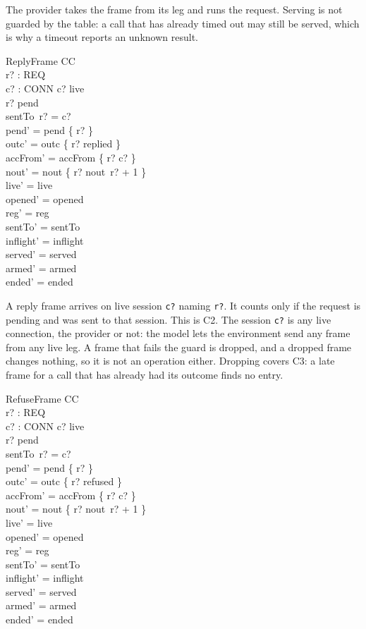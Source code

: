 \documentclass[a4paper,10pt,fleqn]{article}
\begin{document}
The provider takes the frame from its leg and runs the request.  Serving is
not guarded by the table: a call that has already timed out may still be
served, which is why a timeout reports an unknown result.

\begin{schema}{ReplyFrame}
  \Delta CC \\
  r? : REQ \\
  c? : CONN
\where
  c? \in live \\
  r? \in pend \\
  sentTo~r? = c? \\
  pend' = pend \setminus \{ r? \} \\
  outc' = outc \oplus \{ r? \mapsto replied \} \\
  accFrom' = accFrom \oplus \{ r? \mapsto c? \} \\
  nout' = nout \oplus \{ r? \mapsto nout~r? + 1 \} \\
  live' = live \\
  opened' = opened \\
  reg' = reg \\
  sentTo' = sentTo \\
  inflight' = inflight \\
  served' = served \\
  armed' = armed \\
  ended' = ended
\end{schema}

A reply frame arrives on live session \texttt{c?} naming \texttt{r?}.  It
counts only if the request is pending and was sent to that session.  This
is C2.  The session \texttt{c?} is any live connection, the provider or not:
the model lets the environment send any frame from any live leg.  A frame
that fails the guard is dropped, and a dropped frame changes nothing, so it
is not an operation either.  Dropping covers C3: a late frame for a call
that has already had its outcome finds no entry.

\begin{schema}{RefuseFrame}
  \Delta CC \\
  r? : REQ \\
  c? : CONN
\where
  c? \in live \\
  r? \in pend \\
  sentTo~r? = c? \\
  pend' = pend \setminus \{ r? \} \\
  outc' = outc \oplus \{ r? \mapsto refused \} \\
  accFrom' = accFrom \oplus \{ r? \mapsto c? \} \\
  nout' = nout \oplus \{ r? \mapsto nout~r? + 1 \} \\
  live' = live \\
  opened' = opened \\
  reg' = reg \\
  sentTo' = sentTo \\
  inflight' = inflight \\
  served' = served \\
  armed' = armed \\
  ended' = ended
\end{schema}
\end{document}
